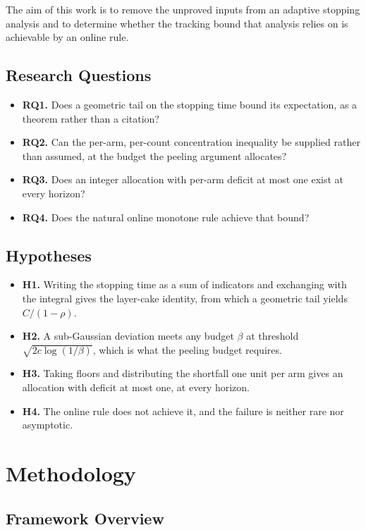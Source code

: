 \documentclass[conference]{IEEEtran}
\theoremstyle{definition}
\begin{document}
The aim of this work is to remove the unproved inputs from an adaptive stopping analysis and
to determine whether the tracking bound that analysis relies on is achievable by an online
rule.

\subsection{Research Questions}

\begin{itemize}
\item \textbf{RQ1.} Does a geometric tail on the stopping time bound its expectation, as a
theorem rather than a citation?
\item \textbf{RQ2.} Can the per-arm, per-count concentration inequality be supplied rather
than assumed, at the budget the peeling argument allocates?
\item \textbf{RQ3.} Does an integer allocation with per-arm deficit at most one exist at every
horizon?
\item \textbf{RQ4.} Does the natural online monotone rule achieve that bound?
\end{itemize}

\subsection{Hypotheses}

\begin{itemize}
\item \textbf{H1.} Writing the stopping time as a sum of indicators and exchanging with the
integral gives the layer-cake identity, from which a geometric tail yields $C/(1-\rho)$.
\item \textbf{H2.} A sub-Gaussian deviation meets any budget $\beta$ at threshold
$\sqrt{2c\log(1/\beta)}$, which is what the peeling budget requires.
\item \textbf{H3.} Taking floors and distributing the shortfall one unit per arm gives an
allocation with deficit at most one, at every horizon.
\item \textbf{H4.} The online rule does not achieve it, and the failure is neither rare nor
asymptotic.
\end{itemize}

\section{Methodology}
\label{sec:setting}

\subsection{Framework Overview}
\end{document}
